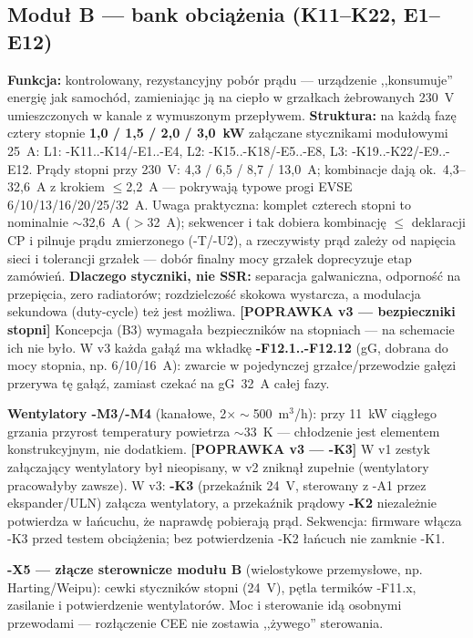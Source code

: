 \documentclass[11pt,a4paper]{article}
\newcommand{\popr}[1]{\textbf{\color{granat}[POPRAWKA v3 --- #1]}}
\begin{document}
\subsection{Moduł B --- bank obciążenia (K11--K22, E1--E12)}
\label{sec:loadbank}
\textbf{Funkcja:} kontrolowany, rezystancyjny pobór prądu --- urządzenie ,,konsumuje'' energię
jak samochód, zamieniając ją na ciepło w grzałkach żebrowanych 230~V umieszczonych w kanale
z wymuszonym przepływem. \textbf{Struktura:} na każdą fazę cztery stopnie
\textbf{1,0 / 1,5 / 2,0 / 3,0~kW} załączane stycznikami modułowymi 25~A:
L1: -K11..-K14/-E1..-E4, L2: -K15..-K18/-E5..-E8, L3: -K19..-K22/-E9..-E12.
Prądy stopni przy 230~V: 4,3 / 6,5 / 8,7 / 13,0~A; kombinacje dają ok.\ 4,3--32,6~A z krokiem
$\le$2,2~A --- pokrywają typowe progi EVSE 6/10/13/16/20/25/32~A. Uwaga praktyczna: komplet
czterech stopni to nominalnie $\sim$32,6~A ($>$32~A); sekwencer i tak dobiera kombinację
$\le$ deklaracji CP i pilnuje prądu zmierzonego (-T/-U2), a rzeczywisty prąd zależy od napięcia
sieci i tolerancji grzałek --- dobór finalny mocy grzałek doprecyzuje etap zamówień.
\textbf{Dlaczego styczniki, nie SSR:} separacja galwaniczna, odporność na przepięcia, zero
radiatorów; rozdzielczość skokowa wystarcza, a modulacja sekundowa (duty-cycle) też jest możliwa.
\popr{bezpieczniki stopni} Koncepcja (B3) wymagała bezpieczników na stopniach --- na schemacie
ich nie było. W v3 każda gałąź ma wkładkę \textbf{-F12.1..-F12.12} (gG, dobrana do mocy stopnia,
np. 6/10/16~A): zwarcie w pojedynczej grzałce/przewodzie gałęzi przerywa tę gałąź, zamiast czekać
na gG~32~A całej fazy.

\textbf{Wentylatory -M3/-M4} (kanałowe, 2$\times\sim$500~m$^3$/h): przy 11~kW ciągłego grzania
przyrost temperatury powietrza $\sim$33~K --- chłodzenie jest elementem konstrukcyjnym, nie
dodatkiem. \popr{-K3} W v1 zestyk załączający wentylatory był nieopisany, w v2 zniknął zupełnie
(wentylatory pracowałyby zawsze). W v3: \textbf{-K3} (przekaźnik 24~V, sterowany z -A1 przez
ekspander/ULN) załącza wentylatory, a przekaźnik prądowy \textbf{-K2} niezależnie potwierdza
w łańcuchu, że naprawdę pobierają prąd. Sekwencja: firmware włącza -K3 przed testem obciążenia;
bez potwierdzenia -K2 łańcuch nie zamknie -K1.

\textbf{-X5 --- złącze sterownicze modułu B} (wielostykowe przemysłowe, np. Harting/Weipu):
cewki styczników stopni (24~V), pętla termików -F11.x, zasilanie i potwierdzenie wentylatorów.
Moc i sterowanie idą osobnymi przewodami --- rozłączenie CEE nie zostawia ,,żywego'' sterowania.
\end{document}
